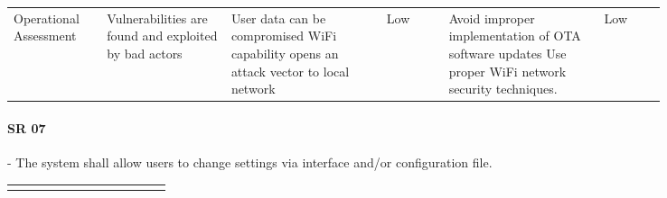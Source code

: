 \begin{landscape}
{\begin{longtable}{| p{0.12\linewidth} | p{0.16\linewidth} |  p{0.20\linewidth} | p{0.08\linewidth} | p{0.20\linewidth} | p{0.08\linewidth} |}
	\hline
	Operational \newline Assessment & Vulnerabilities are found and exploited by bad actors & User data can be compromised \newline WiFi capability opens an attack vector to local network & \cellcolor{green} Low & Avoid improper implementation of OTA software updates \newline Use proper WiFi network security techniques. & \cellcolor{green} Low
	\label{tab:sr06_feasibility}
\end{longtable}
}
\newpage



\paragraph*{SR 07} - The system shall allow users to change settings via interface and/or configuration file.

{\fontsize{8pt}{8pt}\selectfont
\begin{longtable}{| p{0.12\linewidth} | p{0.16\linewidth} |  p{0.20\linewidth} | p{0.08\linewidth} | p{0.20\linewidth} | p{0.08\linewidth} |}
	\hline \endlastfoot
	

\end{longtable}}
\end{landscape}
